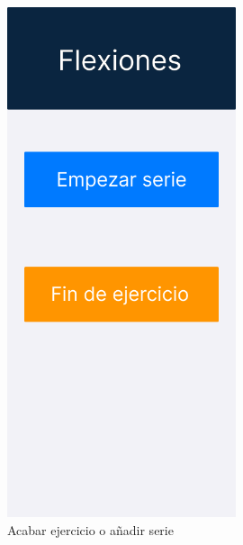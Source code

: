 \begin{figure}[H]
   \centering
    \includegraphics[width=0.6\textwidth]{fotos/Frame 62.png}
    \caption{Acabar ejercicio o añadir serie}
    \label{fig:Acabar ejercicio o añadir serie}
\end{figure}
